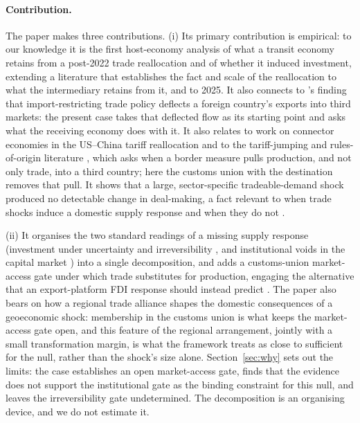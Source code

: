 \documentclass[12pt]{article}
\begin{document}
\paragraph{Contribution.} The paper makes three contributions. (i) Its primary contribution is
empirical: to our knowledge it is the first host-economy analysis of what a transit economy
retains from a post-2022 trade reallocation and of whether it induced investment, extending a
literature that establishes the fact and scale of the reallocation to what the intermediary
retains from it, and to 2025. It also connects to \citet{bowncrowley2007}'s finding that
import-restricting trade policy deflects a foreign country's exports into third markets: the
present case takes that deflected flow as its starting point and asks what the receiving
economy does with it. It also relates to work on connector economies in the US--China tariff reallocation \citep{fajgelbaum2024reallocations,freund2024supplychains} and to the tariff-jumping and rules-of-origin literature \citep{blonigen2002tariffjumping,conconi2018rulesoforigin}, which asks when a border measure pulls production, and not only trade, into a third country; here the customs union with the destination removes that pull. It shows that a large, sector-specific tradeable-demand shock produced no detectable change in deal-making, a fact
relevant to when trade shocks induce a domestic supply response and when they do not
\citep{juhasz2018temporary,bloom2016trade,juhaszlanerodrik2024,gopinathneiman2014}.

(ii) It organises the two standard readings of a missing supply response (investment under
uncertainty and irreversibility \citep{dixitpindyck1994,handleylimao2015,handleylimao2017}, and
institutional voids in the
capital market \citep{khanna1997,khannapalepu2000,rajanzingales1998}) into a single
decomposition, and adds a customs-union market-access gate under which trade substitutes for
production, engaging the alternative that an export-platform FDI response should instead
predict \citep{brainard1997,helpmanmelitzyeaple2004,ekholmforslidmarkusen2007}. The paper also bears
on how a regional trade alliance shapes the domestic consequences of a geoeconomic shock:
membership in the customs union is what keeps the market-access gate open, and this feature
of the regional arrangement, jointly with a small transformation margin, is what the framework
treats as close to sufficient for the null, rather than the shock's size alone.
Section~\ref{sec:why} sets out the limits: the case establishes an open market-access gate,
finds that the evidence does not support the institutional gate as the binding constraint for this null, and leaves the irreversibility gate undetermined. The decomposition is an organising
device, and we do not estimate it.
\end{document}
